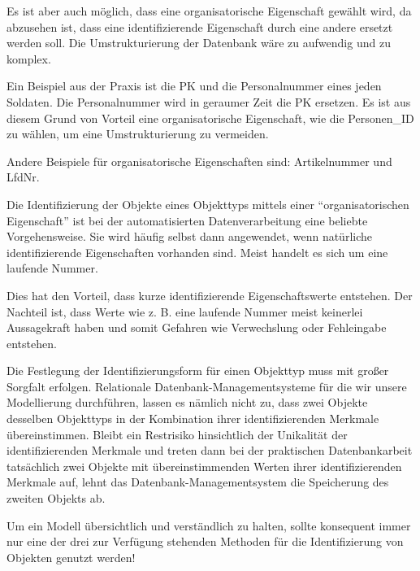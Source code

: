           Es ist aber auch m\"oglich, dass eine organisatorische Eigenschaft
          gew\"ahlt wird, da abzusehen ist, dass eine identifizierende
          Eigenschaft durch eine andere ersetzt werden soll. Die
          Umstrukturierung der Datenbank w\"are zu aufwendig und zu komplex.

          Ein Beispiel aus der Praxis ist die PK und die Personalnummer eines
          jeden Soldaten. Die Personalnummer wird in geraumer Zeit die PK
          ersetzen. Es ist aus diesem Grund von Vorteil eine organisatorische
          Eigenschaft, wie die Personen\_ID zu w\"ahlen, um eine
          Umstrukturierung zu vermeiden.

          Andere Beispiele f\"ur organisatorische Eigenschaften sind:
          Artikelnummer und LfdNr.

          Die Identifizierung der Objekte eines Objekttyps mittels einer
					\enquote{organisatorischen Eigenschaft} ist bei der automatisierten
					Datenverarbeitung eine beliebte Vorgehensweise. Sie wird h\"aufig
					selbst dann angewendet, wenn nat\"urliche identifizierende
					Eigenschaften vorhanden sind. Meist handelt es sich um eine laufende
					Nummer.

					Dies hat den Vorteil, dass kurze identifizierende Eigenschaftswerte
					entstehen. Der Nachteil ist, dass Werte wie z. B. eine laufende
					Nummer meist keinerlei Aussagekraft haben und somit Gefahren wie
					Verwechslung oder Fehleingabe entstehen.

					Die Festlegung der Identifizierungsform f\"ur einen Objekttyp muss mit
					gro\ss er Sorgfalt erfolgen. Relationale Datenbank-Managementsysteme
					f\"ur die wir unsere Modellierung durch\-f\"uh\-ren, lassen es
					n\"amlich nicht zu, dass zwei Objekte desselben Objekttyps in der
					Kombination ihrer identifizierenden Merkmale \"ubereinstimmen. Bleibt
					ein Restrisiko hinsichtlich der Unikalit\"at der identifizierenden
					Merkmale und treten dann bei der praktischen Datenbankarbeit
					tats\"achlich zwei Objekte mit \"ubereinstimmenden Werten ihrer
					identifizierenden Merkmale auf, lehnt das Datenbank-Managementsystem
					die Speicherung des zweiten Objekts ab.

					\begin{merke}
						Um ein Modell \"ubersichtlich und verst\"andlich zu halten, sollte
						konsequent immer nur eine der drei zur Verf\"ugung stehenden
						Methoden f\"ur die Identifizierung von Objekten genutzt werden!
					\end{merke}

